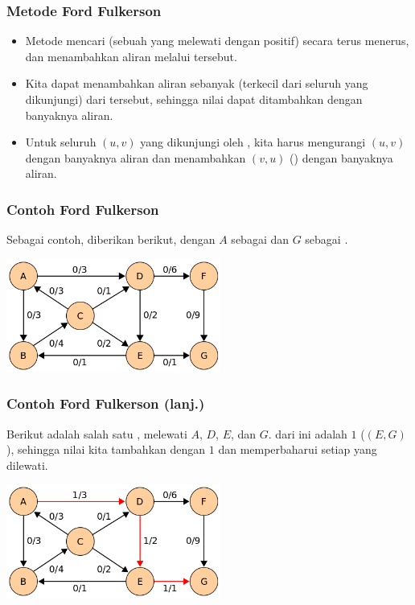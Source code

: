 \begin{frame}
\frametitle{Metode Ford Fulkerson}
\begin{itemize}
  \item Metode  mencari  (sebuah \fpath yang melewati \fedge dengan \fresidualCapacity positif) secara terus menerus, dan menambahkan aliran melalui \fpath tersebut.
  \item Kita dapat menambahkan aliran sebanyak  (\fresidualCapacity terkecil dari seluruh \fedge yang dikunjungi) dari \fpath tersebut, sehingga nilai \fmaxflow dapat ditambahkan dengan banyaknya aliran.
  \item Untuk seluruh \fedge $(u, v)$ yang dikunjungi oleh \fpath, kita harus mengurangi \fresidualCapacity \fedge $(u, v)$ dengan banyaknya aliran dan menambahkan \fresidualCapacity \fedge $(v, u)$ (\fbackEdge) dengan banyaknya aliran.
\end{itemize}
\end{frame}

\begin{frame}
\frametitle{Contoh Ford Fulkerson}
Sebagai contoh, diberikan \fgraph berikut, dengan \fnode $A$ sebagai \fsource dan \fnode $G$ sebagai \fsink.
\newline
\begin{center}
\includegraphics[width=7cm]{asset/ford-example-0.png}
\end{center}
\end{frame}

\begin{frame}
\frametitle{Contoh Ford Fulkerson (lanj.)}
Berikut adalah salah satu \faugmentingPath, melewati \fnode $A$, $D$, $E$, dan $G$. \fBottleneck dari \fpath ini adalah $1$ (\fedge $(E, G)$), sehingga nilai \fmaxflow kita tambahkan dengan $1$ dan memperbaharui \fresidualCapacity setiap \fedge yang dilewati.
\newline
\begin{center}
\includegraphics[width=7cm]{asset/ford-example-1.png}
\end{center}
\end{frame}

